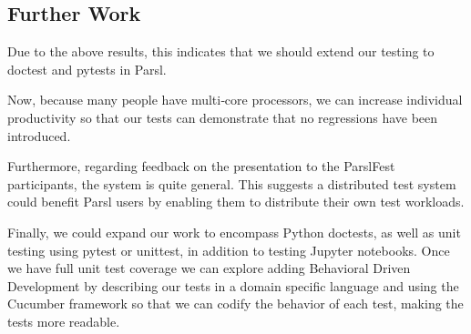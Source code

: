 
\subsection{Further Work}

Due to the above results, this indicates that we should extend our testing to doctest and pytests in Parsl.

Now, because many people have multi‑core processors, we can increase individual productivity so that our tests can demonstrate that no regressions have been introduced.

Furthermore, regarding feedback on the presentation to the ParslFest participants, the system is quite general. This suggests a distributed test system could benefit Parsl users by enabling them to distribute their own test workloads.

Finally, we could expand our work to encompass Python doctests, as well as unit testing using pytest or unittest, in addition to testing Jupyter notebooks. Once we have full unit test coverage we can explore adding Behavioral Driven Development by describing our tests in a domain specific language and using the Cucumber framework so that we can codify the behavior of each test, making the tests more readable.







